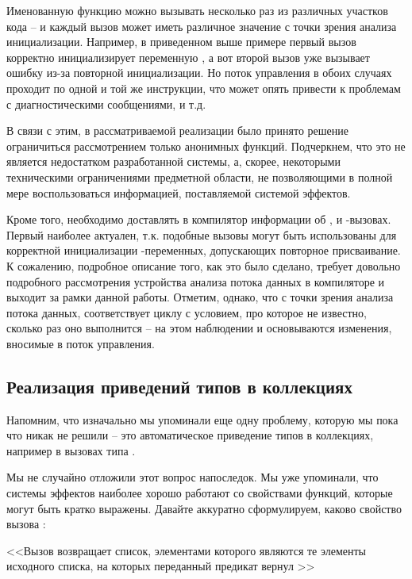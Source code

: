 Именованную функцию можно вызывать несколько раз из различных участков кода -- и каждый вызов может иметь различное значение с точки зрения анализа инициализации. Например, в приведенном выше примере первый вызов корректно инициализирует переменную , а вот второй вызов уже вызывает ошибку из-за повторной инициализации. Но поток управления в обоих случаях проходит по одной и той же инструкции, что может опять привести к проблемам с диагностическими сообщениями, и т.д. 

В связи с этим, в рассматриваемой реализации было принято решение ограничиться рассмотрением только анонимных функций. Подчеркнем, что это не является недостатком разработанной системы, а, скорее, некоторыми техническими ограничениями предметной области, не позволяющими в полной мере воспользоваться информацией, поставляемой системой эффектов.

Кроме того, необходимо доставлять в компилятор информации об ,  и -вызовах. Первый наиболее актуален, т.к. подобные вызовы могут быть использованы для корректной инициализации -переменных, допускающих повторное присваивание. К сожалению, подробное описание того, как это было сделано, требует довольно подробного рассмотрения устройства анализа потока данных в компиляторе  и выходит за рамки данной работы. Отметим, однако, что с точки зрения анализа потока данных,  соответствует циклу  с условием, про которое не известно, сколько раз оно выполнится -- на этом наблюдении и основываются изменения, вносимые в поток управления.


\subsection{Реализация приведений типов в коллекциях}

Напомним, что изначально мы упоминали еще одну проблему, которую мы пока что никак не решили -- это автоматическое приведение типов в коллекциях, например в вызовах типа .

Мы не случайно отложили этот вопрос напоследок. Мы уже упоминали, что системы эффектов наиболее хорошо работают со свойствами функций, которые могут быть кратко выражены. Давайте аккуратно сформулируем, каково свойство вызова :

<<Вызов  возвращает список, элементами которого являются те элементы исходного списка, на которых переданный предикат вернул  >>

